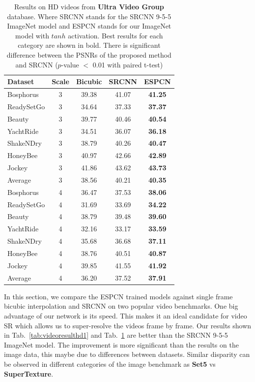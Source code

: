 \documentclass[10pt,twocolumn,letterpaper]{article}
\begin{document}
\begin{table}
\footnotesize
\begin{center}
\begin{tabular}{|l|c|c|c|c|}
\hline
Dataset & Scale  & Bicubic & SRCNN & ESPCN \\
\hline\hline
Bosphorus & 3 & 39.38 & 41.07 & \textbf{41.25} \\
ReadySetGo & 3 & 34.64 & 37.33 & \textbf{37.37} \\
Beauty & 3 & 39.77 & 40.46 & \textbf{40.54} \\
YachtRide & 3 & 34.51 & 36.07 & \textbf{36.18} \\
ShakeNDry & 3 & 38.79 & 40.26 & \textbf{40.47} \\
HoneyBee & 3 & 40.97 & 42.66 & \textbf{42.89} \\
Jockey & 3 & 41.86 & 43.62 & \textbf{43.73} \\
\hline\hline
Average & 3 & 38.56 & 40.21 & \textbf{40.35} \\
\hline\hline
Bosphorus & 4 & 36.47 & 37.53 & \textbf{38.06} \\
ReadySetGo & 4 & 31.69 & 33.69 & \textbf{34.22} \\
Beauty & 4 & 38.79 & 39.48 & \textbf{39.60} \\
YachtRide & 4 & 32.16 & 33.17 & \textbf{33.59} \\
ShakeNDry & 4 & 35.68 & 36.68 & \textbf{37.11} \\
HoneyBee & 4 & 38.76 & 40.51 & \textbf{40.87} \\
Jockey & 4 & 39.85 & 41.55 & \textbf{41.92} \\
\hline\hline
Average & 4 & 36.20 & 37.52 & \textbf{37.91} \\
\hline
\end{tabular}
\end{center}
\caption{Results on HD videos from \textbf{Ultra Video Group} database. Where SRCNN stands for the SRCNN 9-5-5 ImageNet model \cite{dong2015image} and ESPCN stands for our ImageNet model with $tanh$ activation. Best results for each category are shown in bold. There is significant difference between the PSNRs of the proposed method and SRCNN ($p$-value $<$ 0.01 with paired t-test)}
\label{tab:videoresulthd2}
\end{table}

In this section, we compare the ESPCN trained models against single frame bicubic interpolation and SRCNN \cite{dong2015image} on two popular video benchmarks. One big advantage of our network is its speed. This makes it an ideal candidate for video \ac{SR} which allows us to super-resolve the videos frame by frame. Our results shown in Tab.~\ref{tab:videoresulthd1} and Tab.~\ref{tab:videoresulthd2} are better than the SRCNN 9-5-5 ImageNet model. The improvement is more significant than the results on the image data, this maybe due to differences between datasets. Similar disparity can be observed in different categories of the image benchmark as \textbf{Set5} vs \textbf{SuperTexture}.
\end{document}
